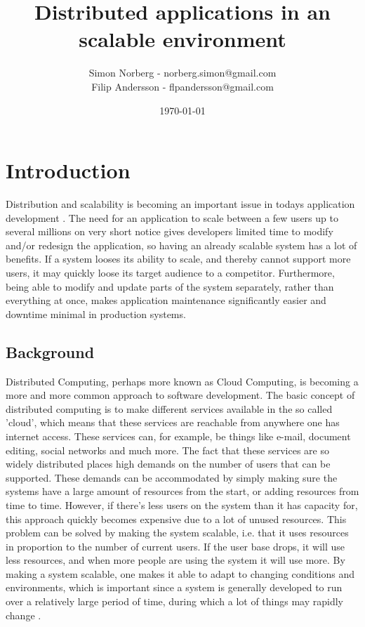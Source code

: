\documentclass{article}
\begin{document}
 
\title{Distributed applications in an scalable environment}
\author{Simon Norberg - norberg.simon@gmail.com\\
        Filip Andersson - flpandersson@gmail.com }
\date{\today}
\maketitle
 
 
\section{Introduction}
Distribution and scalability is becoming an important issue in todays
application development \cite{rellermeyer2007services}.
The need for an application to scale between a few users up to several millions 
on very short notice gives developers limited time to modify and/or redesign 
the application, so having an already scalable system has a lot of benefits. 
If a system looses its ability to scale, and thereby cannot support more users, 
it may quickly loose its target audience to a competitor. Furthermore, being able 
to modify and update parts of the system separately, rather than everything at 
once, makes application maintenance significantly easier and downtime minimal 
in production systems.

\subsection{Background}
Distributed Computing, perhaps more known as Cloud Computing, is becoming a
more and more common approach to software development. The basic concept of 
distributed computing is to make different services available in the so called
'cloud', which means that these services are reachable from anywhere one 
has internet access. These services can, for example, be things like e-mail,
document editing, social networks and much more. The fact that these services
are so widely distributed places high demands on the number of users that can
be supported.  These demands can be accommodated by simply making sure the
systems have a large amount of resources from the start, or adding resources
from time to time. However, if there's
less users on the system than it has capacity for, this approach quickly
becomes expensive due to a lot of unused resources. This problem can be solved
by making the system scalable, i.e. that it uses resources in proportion to the
number of current users. If the user base drops, it will use less resources,
and when more people are using the system it will use more. By making a system
scalable, one makes it able to adapt to changing conditions and environments, 
which is important since a system is generally developed to run over a 
relatively large period of time, during which a lot of things may rapidly 
change \cite{van1998software} \cite{caruso1997toward}.
 
\end{document}
